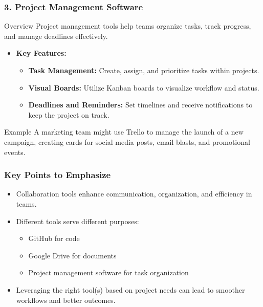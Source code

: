 \documentclass[aspectratio=169]{beamer}
\begin{document}
\begin{frame}[fragile]
    \frametitle{3. Project Management Software}
    \begin{block}{Overview}
        Project management tools help teams organize tasks, track progress, and manage deadlines effectively.
    \end{block}

    \begin{itemize}
        \item \textbf{Key Features:}
        \begin{itemize}
            \item \textbf{Task Management:} Create, assign, and prioritize tasks within projects.
            \item \textbf{Visual Boards:} Utilize Kanban boards to visualize workflow and status.
            \item \textbf{Deadlines and Reminders:} Set timelines and receive notifications to keep the project on track.
        \end{itemize}
    \end{itemize}

    \begin{block}{Example}
        A marketing team might use Trello to manage the launch of a new campaign, creating cards for social media posts, email blasts, and promotional events.
    \end{block}
\end{frame}

\begin{frame}[fragile]
    \frametitle{Key Points to Emphasize}
    \begin{itemize}
        \item Collaboration tools enhance communication, organization, and efficiency in teams.
        \item Different tools serve different purposes: 
        \begin{itemize}
            \item GitHub for code
            \item Google Drive for documents
            \item Project management software for task organization
        \end{itemize}
        \item Leveraging the right tool(s) based on project needs can lead to smoother workflows and better outcomes.
    \end{itemize}
\end{frame}
\end{document}
